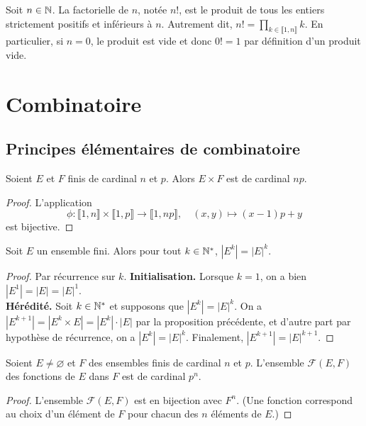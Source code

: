 \begin{definition}[Factorielle]
Soit $n\in \mathbb{N}$. La factorielle de $n$, notée $n!$, est le produit de tous les entiers strictement positifs et inférieurs à $n$. Autrement dit, $n! = \prod_{k \in \llbracket 1,n\rrbracket} k$. En particulier, si $n=0$, le produit est vide et donc $0!=1$ par définition d'un produit vide. 
\end{definition}


\section{Combinatoire}
\subsection{Principes élémentaires de combinatoire}

\begin{proposition}
Soient $E$ et $F$ finis de cardinal $n$ et $p$. Alors $E\times F$ est de cardinal $np$.
\end{proposition}
\begin{proof}
L'application 
\[
\phi : \llbracket 1,n\rrbracket \times \llbracket 1,p\rrbracket\to \llbracket 1,np\rrbracket,\quad
(x,y)\mapsto (x-1)p+y
\]
est bijective.
\end{proof}
\begin{corollaire}
Soit $E$ un ensemble fini. Alors pour tout $k\in \mathbb{N}^*$, $|E^k|=|E|^k$.
\end{corollaire}
\begin{proof}
Par récurrence sur $k$. 
\textbf{Initialisation. }Lorsque $k=1$, on a bien  $|E^1|=|E|=|E|^1$.\\
\textbf{Hérédité.} Soit $k\in \mathbb{N}^*$ et supposons que $|E^k|=|E|^k$.
On a $|E^{k+1}| = |E^k\times E|=|E^k|\cdot |E|$ par la proposition précédente, et d'autre part par hypothèse de récurrence, on a $|E^k|=|E|^k$. Finalement,  $|E^{k+1}|=|E|^{k+1}$. 
\end{proof}

\begin{corollaire}
Soient $E\neq \varnothing$ et $F$ des ensembles finis de cardinal  $n$ et $p$. L'ensemble $\mathcal F(E,F)$ des fonctions de $E$ dans $F$ est de cardinal $p^n$. 
\end{corollaire}
\begin{proof}
L'ensemble $\mathcal F(E,F)$ est en bijection avec $F^n$. (Une fonction correspond au choix d'un élément de $F$ pour chacun des $n$ éléments de $E$.) 
\end{proof}

